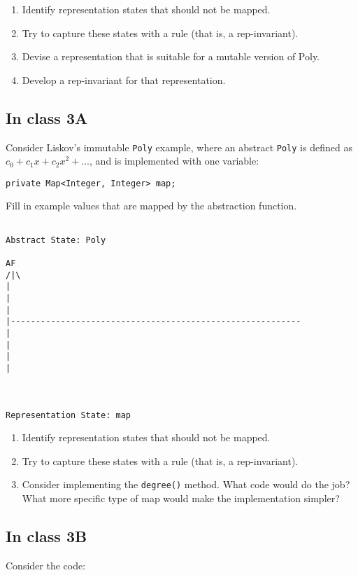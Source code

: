\documentclass[11pt]{article}
\begin{document}
\begin{enumerate}
\item Identify representation states that should not be mapped.
\item Try to capture these states with a rule (that is, a rep-invariant).
\item Devise a representation that is suitable for a mutable version of Poly.
\item Develop a rep-invariant for that representation.
\end{enumerate}

\subsection{In class 3A}
\label{sec:org450d1ac}
Consider Liskov's immutable \texttt{Poly} example, where an abstract \texttt{Poly} is defined as \(c_0 + c_1x + c_2x^2 + \dots\), and is implemented with one variable:

\begin{verbatim}
private Map<Integer, Integer> map;
\end{verbatim}


Fill in example values that are mapped by the abstraction function.

\begin{verbatim}

Abstract State: Poly

AF
/|\
|
|
|
|----------------------------------------------------------
|
|
|
|



Representation State: map

\end{verbatim}

\begin{enumerate}
\item Identify representation states that should not be mapped.
\item Try to capture these states with a rule (that is, a rep-invariant).
\item Consider implementing the \texttt{degree()} method. What code would do the job? What more specific type of map would make the implementation simpler?
\end{enumerate}

\subsection{In class 3B}
\label{sec:orga9deffd}
Consider the code:
\end{document}
